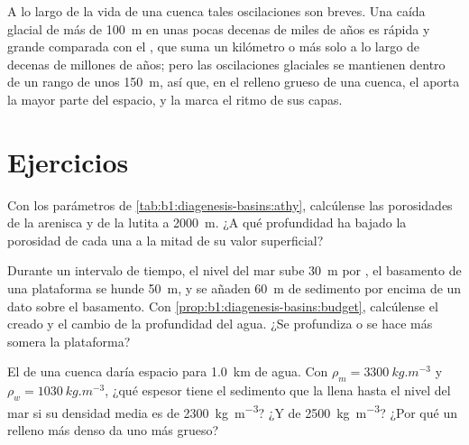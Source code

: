 A lo largo de la vida de una cuenca tales oscilaciones son breves. Una caída glacial de más de \qty{100}{m} en unas pocas decenas de miles de años es rápida y grande comparada con el , que suma un kilómetro o más solo a lo largo de decenas de millones de años; pero las oscilaciones glaciales se mantienen dentro de un rango de unos \qty{150}{m}, así que, en el relleno grueso
de una cuenca, el  aporta la mayor parte del espacio, y la  marca el ritmo de sus capas.

\section{Ejercicios}

\begin{exercise}[$\star$]\label{exo:b1:diagenesis-basins:1}
Con los parámetros de \cref{tab:b1:diagenesis-basins:athy}, calcúlense las porosidades de la arenisca y de la lutita a \qty{2000}{m}. ¿A qué profundidad ha bajado la porosidad de cada una a la mitad de su valor superficial?
\end{exercise}

\begin{exercise}[$\star$]\label{exo:b1:diagenesis-basins:2}
Durante un intervalo de tiempo, el nivel del mar sube \qty{30}{m} por , el basamento de una plataforma se hunde \qty{50}{m}, y se añaden \qty{60}{m} de sedimento por encima de un dato
sobre el basamento. Con \cref{prop:b1:diagenesis-basins:budget}, calcúlense el  creado y el cambio de la profundidad del agua. ¿Se profundiza o se hace más somera la plataforma?
\end{exercise}

\begin{exercise}[$\star$]\label{exo:b1:diagenesis-basins:3}
El  de una cuenca daría espacio para \qty{1.0}{km} de agua. Con $\rho_m = \qty{3300}{kg.m^{-3}}$ y $\rho_w = \qty{1030}{kg.m^{-3}}$, ¿qué espesor tiene el sedimento que la llena hasta el
nivel del mar si su densidad media es de \qty{2300}{kg.m^{-3}}? ¿Y de \qty{2500}{kg.m^{-3}}? ¿Por qué un relleno más denso da uno más grueso?
\end{exercise}


